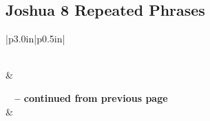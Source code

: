 \subsection{Joshua 8 Repeated Phrases}


\normalsize
 
\begin{center}
\begin{longtable}{|p{3.0in}|p{0.5in}|}
\caption[Joshua 8 Repeated Phrases]{Joshua 8 Repeated Phrases}\label{table:Repeated Phrases Joshua 8} \\
\hline {} &  \\ \hline 
\endfirsthead
 
{{\bfseries \tablename\ \thetable{} -- continued from previous page}} \\  
\hline {} &  \\ \hline 
\endhead
 

\end{longtable}
\end{center}
